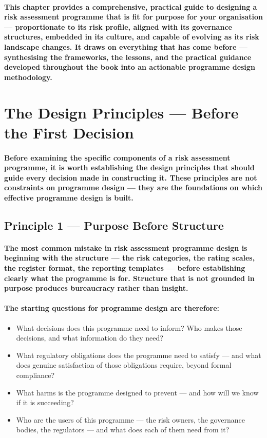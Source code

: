 \paragraph{This chapter provides a comprehensive, practical guide to designing a risk assessment programme that is fit for purpose for your organisation — proportionate to its risk profile, aligned with its governance structures, embedded in its culture, and capable of evolving as its risk landscape changes. It draws on everything that has come before — synthesising the frameworks, the lessons, and the practical guidance developed throughout the book into an actionable programme design methodology.}

\section{The Design Principles — Before the First Decision}
\paragraph{Before examining the specific components of a risk assessment programme, it is worth establishing the design principles that should guide every decision made in constructing it. These principles are not constraints on programme design — they are the foundations on which effective programme design is built.}

\subsection{Principle 1 — Purpose Before Structure}
\paragraph{The most common mistake in risk assessment programme design is beginning with the structure — the risk categories, the rating scales, the register format, the reporting templates — before establishing clearly what the programme is for. Structure that is not grounded in purpose produces bureaucracy rather than insight.}
\paragraph{The starting questions for programme design are therefore:}
\begin{itemize}
  \item{What decisions does this programme need to inform? Who makes those decisions, and what information do they need?}
  \item{What regulatory obligations does the programme need to satisfy — and what does genuine satisfaction of those obligations require, beyond formal compliance?}
  \item{What harms is the programme designed to prevent — and how will we know if it is succeeding?}
  \item{Who are the users of this programme — the risk owners, the governance bodies, the regulators — and what does each of them need from it?}
\end{itemize}
